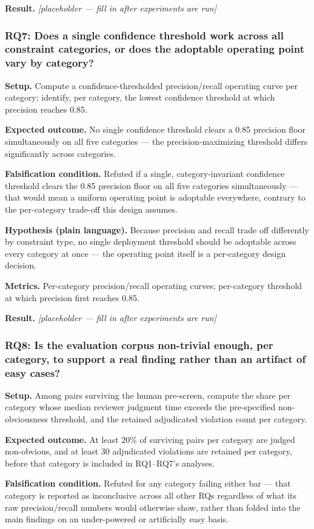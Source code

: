 \documentclass[11pt]{article}
\newcommand{\ph}{\textit{[placeholder --- fill in after experiments are run]}}
\begin{document}
\textbf{Result.} \ph

\subsubsection{RQ7: Does a single confidence threshold work across all constraint categories, or does the adoptable operating point vary by category?}
\textbf{Setup.} Compute a confidence-thresholded precision/recall operating curve per category; identify, per category, the lowest confidence threshold at which precision reaches 0.85.

\textbf{Expected outcome.} No single confidence threshold clears a 0.85 precision floor simultaneously on all five categories --- the precision-maximizing threshold differs significantly across categories.

\textbf{Falsification condition.} Refuted if a single, category-invariant confidence threshold clears the 0.85 precision floor on all five categories simultaneously --- that would mean a uniform operating point is adoptable everywhere, contrary to the per-category trade-off this design assumes.

\textbf{Hypothesis (plain language).} Because precision and recall trade off differently by constraint type, no single deployment threshold should be adoptable across every category at once --- the operating point itself is a per-category design decision.

\textbf{Metrics.} Per-category precision/recall operating curves; per-category threshold at which precision first reaches 0.85.

\textbf{Result.} \ph

\subsubsection{RQ8: Is the evaluation corpus non-trivial enough, per category, to support a real finding rather than an artifact of easy cases?}
\textbf{Setup.} Among pairs surviving the human pre-screen, compute the share per category whose median reviewer judgment time exceeds the pre-specified non-obviousness threshold, and the retained adjudicated violation count per category.

\textbf{Expected outcome.} At least 20\% of surviving pairs per category are judged non-obvious, and at least 30 adjudicated violations are retained per category, before that category is included in RQ1--RQ7's analyses.

\textbf{Falsification condition.} Refuted for any category failing either bar --- that category is reported as inconclusive across all other RQs regardless of what its raw precision/recall numbers would otherwise show, rather than folded into the main findings on an under-powered or artificially easy basis.
\end{document}
